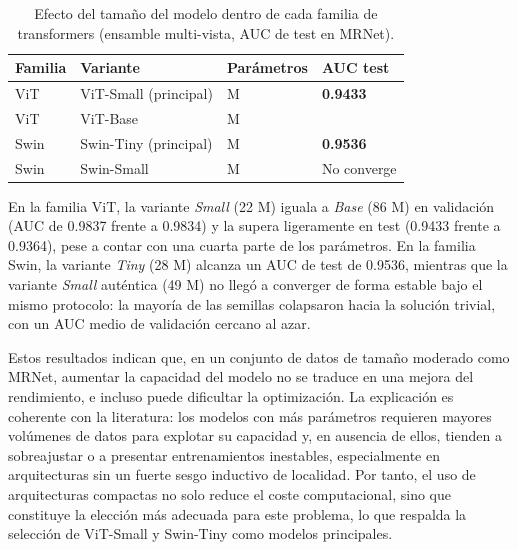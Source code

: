 \begin{table}[H]
\centering
\small
\caption{Efecto del tamaño del modelo dentro de cada familia de transformers (ensamble multi-vista, AUC de test en MRNet).}
\label{tab:efecto_tamano}
\begin{tabularx}{\textwidth}{
>{\raggedright\arraybackslash}X
>{\raggedright\arraybackslash}m{3.0cm}
>{\centering\arraybackslash}m{2.2cm}
>{\centering\arraybackslash}m{2.2cm}
}
\toprule
\textbf{Familia} &
\textbf{Variante} &
\textbf{Parámetros} &
\textbf{AUC test} \\
\midrule
ViT  & ViT-Small (principal) & 22 M & \textbf{0.9433} \\
ViT  & ViT-Base              & 86 M & 0.9364 \\
\midrule
Swin & Swin-Tiny (principal) & 28 M & \textbf{0.9536} \\
Swin & Swin-Small            & 49 M & No converge \\
\bottomrule
\end{tabularx}
\end{table}

En la familia ViT, la variante \textit{Small} (22 M) iguala a \textit{Base} (86 M) en validación (AUC de 0.9837 frente a 0.9834) y la supera ligeramente en test (0.9433 frente a 0.9364), pese a contar con una cuarta parte de los parámetros. En la familia Swin, la variante \textit{Tiny} (28 M) alcanza un AUC de test de 0.9536, mientras que la variante \textit{Small} auténtica (49 M) no llegó a converger de forma estable bajo el mismo protocolo: la mayoría de las semillas colapsaron hacia la solución trivial, con un AUC medio de validación cercano al azar.

Estos resultados indican que, en un conjunto de datos de tamaño moderado como MRNet, aumentar la capacidad del modelo no se traduce en una mejora del rendimiento, e incluso puede dificultar la optimización. La explicación es coherente con la literatura: los modelos con más parámetros requieren mayores volúmenes de datos para explotar su capacidad y, en ausencia de ellos, tienden a sobreajustar o a presentar entrenamientos inestables, especialmente en arquitecturas sin un fuerte sesgo inductivo de localidad. Por tanto, el uso de arquitecturas compactas no solo reduce el coste computacional, sino que constituye la elección más adecuada para este problema, lo que respalda la selección de ViT-Small y Swin-Tiny como modelos principales.



